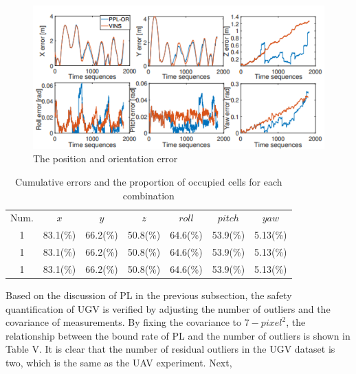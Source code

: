 \documentclass[10pt, letterpaper]{article}
\begin{document}
\begin{multicols*}{2}
\begin{enumerate}
\begin{figure}[H]
    \centering
    \includegraphics[width=\columnwidth]{images/seq3.png}
    \caption{The position and orientation error  }
    \label{fig:Frame_sequence3}
\end{figure}
\end{enumerate}

\begin{table}[H] %
    \centering
    \begin{tabular}{ccccccc}
    \hline
        Num. & $x$  & $y$ & $z$ & $roll$ & $pitch$ & $yaw$\\
        1 & 83.1(\%) &66.2(\%) & 50.8(\%) & 64.6(\%) & 53.9(\%) & 5.13(\%)\\
        1 & 83.1(\%) &66.2(\%) & 50.8(\%) & 64.6(\%) & 53.9(\%) & 5.13(\%)\\
        1 & 83.1(\%) &66.2(\%) & 50.8(\%) & 64.6(\%) & 53.9(\%) & 5.13(\%)\\
    \hline
    \end{tabular}
    \caption{ Cumulative errors and the proportion of occupied cells for each combination}
    \label{tab:table2}
\end{table}

Based on the discussion of PL in the previous subsection, the
safety quantification of UGV is verified by adjusting the
number of outliers and the covariance of measurements. By
fixing the covariance to $7-pixel^2$, the relationship between the
bound rate of PL and the number of outliers is shown in Table
V. It is clear that the number of residual outliers in the UGV
dataset is two, which is the same as the UAV experiment. Next,



{\small


}
\end{multicols*}
\end{document}
